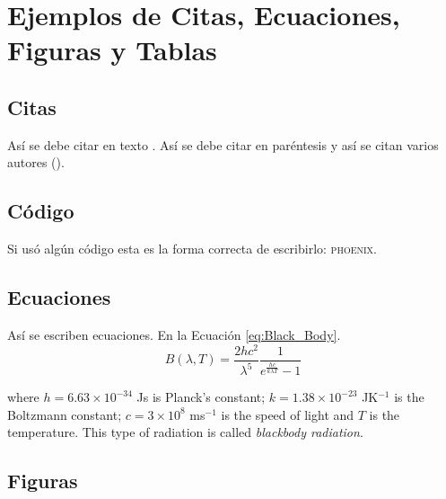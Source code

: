 
\section*{Ejemplos de Citas, Ecuaciones, Figuras y Tablas}

\subsection*{Citas}

Así se debe citar en texto \citet{Rybicki1986}. Así se debe citar en paréntesis \citep{Wilson1957} y así se citan varios autores (\citealp{Wilson1957, Konstantinova-Antova2010, Rybicki1986}).\\

\lipsum[1-1]

\subsection*{Código}

Si usó algún código esta es la forma correcta de escribirlo: \textsc{phoenix}.\\

\lipsum[1-1]

\subsection*{Ecuaciones}

Así se escriben ecuaciones. En la Ecuación \ref{eq:Black_Body}.\\

\begin{equation}
	B(\lambda, T)=\dfrac{2 h c^{2}}{\lambda^{5}}\dfrac{1}{e^{\frac{hc}{k\lambda T}}-1}
	\label{eq:Black_Body}
\end{equation}

\vspace{0.5cm}

\noindent where $h=6.63\times10^{-34}$ Js is Planck's constant; $k=1.38\times10^{-23}$ JK$^{-1}$ is the Boltzmann constant; $c=3\times10^{8}$ ms$^{-1}$ is the speed of light and $T$ is the temperature. This type of radiation is called \textit{blackbody radiation}.

\subsection*{Figuras}

